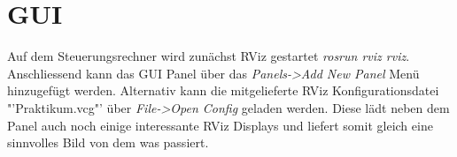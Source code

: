 \section{GUI}
Auf dem Steuerungsrechner wird zunächst RViz gestartet \emph{rosrun rviz rviz}. Anschliessend kann das GUI Panel über das \emph{Panels->Add New Panel} Menü hinzugefügt werden. Alternativ kann die mitgelieferte RViz Konfigurationsdatei  "'Praktikum.vcg"'  über \emph{File->Open Config} geladen werden. Diese lädt neben dem Panel auch noch einige interessante RViz Displays und liefert somit gleich eine sinnvolles Bild von dem was passiert.